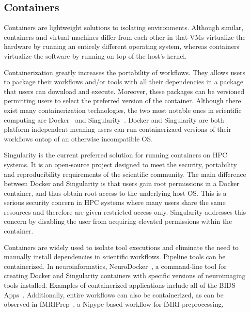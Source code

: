        \subsection{Containers}

            Containers are lightweight solutions to isolating environments.
            Although similar, containers and virtual machines differ from each
            other in that VMs virtualize the hardware by running an entirely
            different operating system, whereas containers virtualize the
            software by running on top of the host's kernel. 
        
            Containerization greatly increases the portability of workflows.
            They allows users to package their workflows and/or tools with all
            their dependencies in a package that users can download and execute.
            Moreover, these packages can be versioned permitting users to select
            the preferred version of the container. Although there exist many
            containerization technologies, the two most notable ones in
            scientific computing are Docker~\cite{merkel2014docker} and
            Singularity~\cite{10.1371/journal.pone.0177459}. Docker and
            Singularity are both platform independent meaning users can run
            containerizaed versions of their workflows ontop of an otherwise
            incompatible OS.

            Singularity is the current preferred solution for running containers
            on HPC systems. It is an open-source project designed to meet the
            security, portability and reproducibility requirements of the
            scientific community. The main difference between Docker and
            Singularity is that users gain root permissions in a Docker
            container, and thus obtain root access to the underlying host OS.
            This is a serious security concern in HPC systems where many users
            share the same resources and therefore are given restricted access
            only. Singularity addresses this concern by disabling the user from
            acquiring elevated permissions within the container. 

            Containers are widely used to isolate tool executions and eliminate
            the need to manually install dependencies in scientific workflows.
            Pipeline tools can be containerized. In neuroinformatics,
            NeuroDocker~\cite{neurodoc}, a command-line tool for creating Docker
            and Singularity containers with specific versions of neuroimaging
            tools installed. Examples of containerized applications include all
            of the BIDS Apps~\cite{10.1371/journal.pcbi.1005209}. Additionally,
            entire workflows can also be containerized, as can be observed in
            fMRIPrep~\cite{Esteban306951}, a Nipype-based workflow for fMRI
            preprocessing.
            
